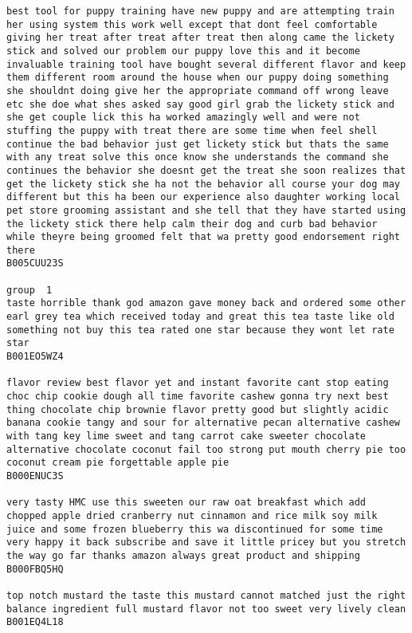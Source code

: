 \documentclass[11pt]{article}
\begin{document}
\begin{Verbatim}[commandchars=\\\{\}]
best tool for puppy training have new puppy and are attempting train her using system this work well except that dont feel comfortable giving her treat after treat after treat then along came the lickety stick and solved our problem our puppy love this and it become invaluable training tool have bought several different flavor and keep them different room around the house when our puppy doing something she shouldnt doing give her the appropriate command off wrong leave etc she doe what shes asked say good girl grab the lickety stick and she get couple lick this ha worked amazingly well and were not stuffing the puppy with treat there are some time when feel shell continue the bad behavior just get lickety stick but thats the same with any treat solve this once know she understands the command she continues the behavior she doesnt get the treat she soon realizes that get the lickety stick she ha not the behavior all course your dog may different but this ha been our experience also daughter working local pet store grooming assistant and she tell that they have started using the lickety stick there help calm their dog and curb bad behavior while theyre being groomed felt that wa pretty good endorsement right there
B005CUU23S

group  1
taste horrible thank god amazon gave money back and ordered some other earl grey tea which received today and great this tea taste like old something not buy this tea rated one star because they wont let rate star
B001EO5WZ4

flavor review best flavor yet and instant favorite cant stop eating choc chip cookie dough all time favorite cashew gonna try next best thing chocolate chip brownie flavor pretty good but slightly acidic banana cookie tangy and sour for alternative pecan alternative cashew with tang key lime sweet and tang carrot cake sweeter chocolate alternative chocolate coconut fail too strong put mouth cherry pie too coconut cream pie forgettable apple pie
B000ENUC3S

very tasty HMC use this sweeten our raw oat breakfast which add chopped apple dried cranberry nut cinnamon and rice milk soy milk juice and some frozen blueberry this wa discontinued for some time very happy it back subscribe and save it little pricey but you stretch the way go far thanks amazon always great product and shipping
B000FBQ5HQ

top notch mustard the taste this mustard cannot matched just the right balance ingredient full mustard flavor not too sweet very lively clean
B001EQ4L18


\end{Verbatim}
\end{document}
